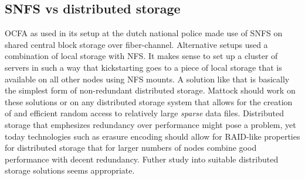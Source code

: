 \subsection{SNFS vs distributed storage}
OCFA as used in its setup at the dutch national police made use of SNFS on shared central block storage over fiber-channel. Alternative setups used a combination of local storage with NFS. It makes sense to set up a cluster of servers in such a way that kickstarting goes to a piece of local storage that is available on all other nodes using NFS mounts. A solution like that is basically the simplest form of non-redundant distributed storage. Mattock should work on these solutions or on any distributed storage system that allows for the creation of and efficient random access to relatively large \emph{sparse} data files. Distributed storage that emphesizes redundancy over performance might pose a problem, yet today technologies such as erasure encoding should allow for RAID-like properties for distributed storage that for larger numbers of nodes combine good performance with decent redundancy. Futher study into suitable distributed storage solutions seems appropriate.
